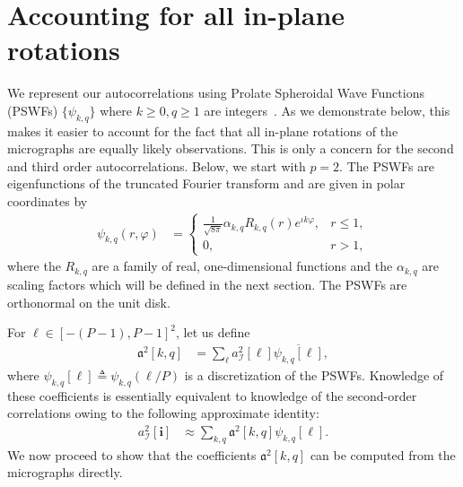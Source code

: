 \documentclass[english,11pt]{article}
\newcommand{\1}{\mathbf{1}}
\newcommand{\II}{\mathcal{I}}
\newcommand{\mb}{\mathbf}
\newcommand*\Bell{\ensuremath{\boldsymbol\ell}}
\newcommand{\TODO}[1]{{\color{red}{[#1]}}}
\numberwithin{equation}{section}
\theoremstyle{plain}
\theoremstyle{definition}
\theoremstyle{remark}
\theoremstyle{plain}
\theoremstyle{remark}
\theoremstyle{plain}
\theoremstyle{plain}
\begin{document}
\section{Accounting for all in-plane rotations} \label{sec:steering}

We represent our autocorrelations using Prolate Spheroidal Wave Functions (PSWFs) $\{\psi_{k,q}\}$ where $k \geq 0, q \geq 1$ are integers~\cite{landa2017steerable}. As we demonstrate below, this makes it easier to account for the fact that all in-plane rotations of the micrographs are equally likely observations. This is only a concern for the second and third order autocorrelations. Below, we start with $p=2$.
The PSWFs are eigenfunctions of the truncated Fourier transform and are given in polar coordinates by
\begin{align}
	\psi_{k,q}(r,\varphi) & = \left\{\begin{array}{ll} \frac{1}{\sqrt{8\pi}}\alpha_{k,q}R_{k,q}(r)e^{\iota k\varphi}, & r\leq 1,\\ 0, & r>1,\end{array}\right. \label{eq:prolatesdef}
\end{align}
where the ${R_{k,q}}$ are a family of real, one-dimensional functions and the ${\alpha_{k,q}}$ are \TODO{real?} scaling factors which will be defined in the next section.
The PSWFs are orthonormal on the unit disk.

For $\Bell \in [-(P-1), P-1]^2$, let us define 
\[\begin{aligned} 
\mathfrak{a}^2[k, q] & =
\sum_{\Bell}a^2_\II[\Bell]\overline{\psi_{k,q}[\Bell]}, \end{aligned}\]
where $\psi_{k,q}[\Bell] \triangleq \psi_{k,q}(\Bell/P)$ \TODO{?} is a discretization of the PSWFs. \TODO{Range of $k,q$? need approx orthonormality in discrete...}
Knowledge of these coefficients is essentially equivalent to knowledge of the second-order correlations owing to the following approximate identity:
\begin{align}
 a^2_\II[\mb i] & \approx \sum_{k,q}\mathfrak{a}^2[k,q]\psi_{k,q}[\Bell].
 \label{eq:approxprolatesdiscrete}
\end{align}
We now proceed to show that the coefficients $\mathfrak{a}^2[k, q]$ can be computed from the micrographs directly.
\end{document}
